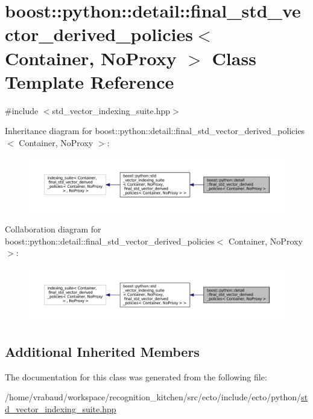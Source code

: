\hypertarget{classboost_1_1python_1_1detail_1_1final__std__vector__derived__policies}{\section{boost\-:\-:python\-:\-:detail\-:\-:final\-\_\-std\-\_\-vector\-\_\-derived\-\_\-policies$<$ Container, No\-Proxy $>$ Class Template Reference}
\label{classboost_1_1python_1_1detail_1_1final__std__vector__derived__policies}
}


{\ttfamily \#include $<$std\-\_\-vector\-\_\-indexing\-\_\-suite.\-hpp$>$}



Inheritance diagram for boost\-:\-:python\-:\-:detail\-:\-:final\-\_\-std\-\_\-vector\-\_\-derived\-\_\-policies$<$ Container, No\-Proxy $>$\-:\nopagebreak
\begin{figure}[H]
\begin{center}
\leavevmode
\includegraphics[width=350pt]{classboost_1_1python_1_1detail_1_1final__std__vector__derived__policies__inherit__graph}
\end{center}
\end{figure}


Collaboration diagram for boost\-:\-:python\-:\-:detail\-:\-:final\-\_\-std\-\_\-vector\-\_\-derived\-\_\-policies$<$ Container, No\-Proxy $>$\-:\nopagebreak
\begin{figure}[H]
\begin{center}
\leavevmode
\includegraphics[width=350pt]{classboost_1_1python_1_1detail_1_1final__std__vector__derived__policies__coll__graph}
\end{center}
\end{figure}
\subsection*{Additional Inherited Members}


The documentation for this class was generated from the following file\-:\begin{DoxyCompactItemize}
\item 
/home/vrabaud/workspace/recognition\-\_\-kitchen/src/ecto/include/ecto/python/\hyperlink{std__vector__indexing__suite_8hpp}{std\-\_\-vector\-\_\-indexing\-\_\-suite.\-hpp}\end{DoxyCompactItemize}
